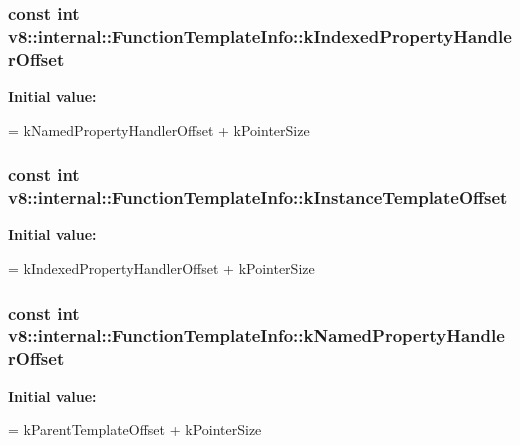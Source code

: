 \subsubsection[{k\+Indexed\+Property\+Handler\+Offset}]{\setlength{\rightskip}{0pt plus 5cm}const int v8\+::internal\+::\+Function\+Template\+Info\+::k\+Indexed\+Property\+Handler\+Offset\hspace{0.3cm}{\ttfamily [static]}}\label{classv8_1_1internal_1_1_function_template_info_a10153571866872320285f7f60686ce33}
{\bfseries Initial value\+:}
\begin{DoxyCode}
=
      kNamedPropertyHandlerOffset + kPointerSize
\end{DoxyCode}
\hypertarget{classv8_1_1internal_1_1_function_template_info_a718d431c763bdeb6f9296f565917bcd5}{}
\subsubsection[{k\+Instance\+Template\+Offset}]{\setlength{\rightskip}{0pt plus 5cm}const int v8\+::internal\+::\+Function\+Template\+Info\+::k\+Instance\+Template\+Offset\hspace{0.3cm}{\ttfamily [static]}}\label{classv8_1_1internal_1_1_function_template_info_a718d431c763bdeb6f9296f565917bcd5}
{\bfseries Initial value\+:}
\begin{DoxyCode}
=
      kIndexedPropertyHandlerOffset + kPointerSize
\end{DoxyCode}
\hypertarget{classv8_1_1internal_1_1_function_template_info_a80ab9a5f2c7652897ef9e13c41e8abc3}{}
\subsubsection[{k\+Named\+Property\+Handler\+Offset}]{\setlength{\rightskip}{0pt plus 5cm}const int v8\+::internal\+::\+Function\+Template\+Info\+::k\+Named\+Property\+Handler\+Offset\hspace{0.3cm}{\ttfamily [static]}}\label{classv8_1_1internal_1_1_function_template_info_a80ab9a5f2c7652897ef9e13c41e8abc3}
{\bfseries Initial value\+:}
\begin{DoxyCode}
=
      kParentTemplateOffset + kPointerSize
\end{DoxyCode}
\hypertarget{classv8_1_1internal_1_1_function_template_info_a55c986ed16644ef6ed27d17c09f2ab3a}{}
